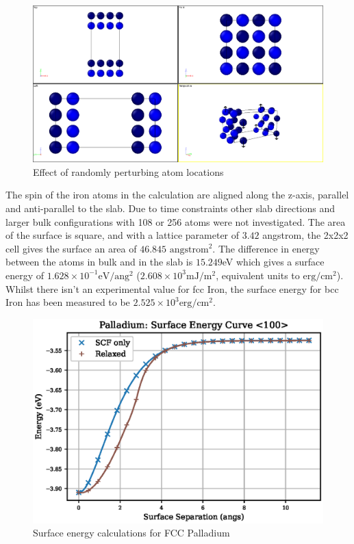 \begin{figure}[h]
\begin{center}
\includegraphics[width=0.5\linewidth]{chapters/results_dft_reference_db/defects/fe_slab.png}
\caption{Effect of randomly perturbing atom locations}
\label{fig:ironsurfaceenergy}
\end{center}
\end{figure}

The spin of the iron atoms in the calculation are aligned along the z-axis, parallel and anti-parallel to the slab.  Due to time constraints other slab directions and larger bulk configurations with 108 or 256 atoms were not investigated.  The area of the surface is square, and with a lattice parameter of $3.42$ angstrom, the 2x2x2 cell gives the surface an area of $46.845 \text{ angstrom}^2$.  The difference in energy between the atoms in bulk and in the slab is $15.249$eV which gives a surface energy of $1.628 \times 10^{-1} \text{eV}/\text{ang}^{2}$ ($2.608 \times 10^3 \text{mJ}/\text{m}^2$, equivalent units to $\text{erg}/\text{cm}^{2}$).  Whilst there isn't an experimental value for \acrshort{fcc} Iron, the surface energy for \acrshort{bcc} Iron has been measured to be $2.525 \times 10^{3} \text{erg}/\text{cm}^{2}$\cite{ironsurfaceenergy}.

\begin{figure}[h]
\begin{center}
\includegraphics[width=0.5\linewidth]{chapters/results_dft_reference_db/plots/pd/pd_surface_energy.eps}
\caption{Surface energy calculations for FCC Palladium}
\label{fig:pdsurfaceenergy}
\end{center}
\end{figure}

